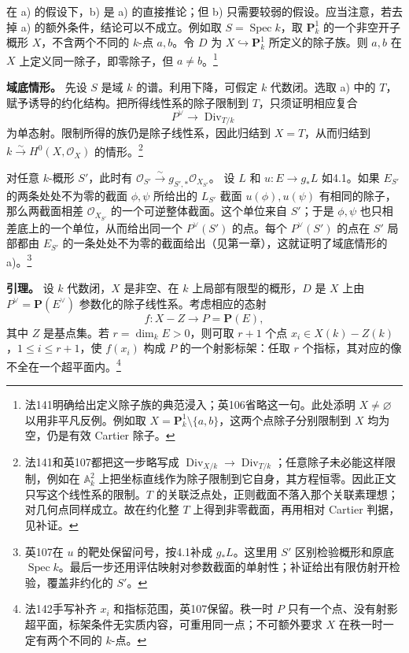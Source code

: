 \documentclass[openany,fontset=fandol]{ctexbook}
\DeclareMathOperator{\Spec}{Spec}
\DeclareMathOperator{\Div}{Div}
\newcommand{\OO}{\mathcal O}
\newcommand{\PP}{\mathbf P}
\begin{document}
在 a) 的假设下，b) 是 a) 的直接推论；但 b) 只需要较弱的假设。应当注意，若去掉 a) 的额外条件，结论可以不成立。例如取 \(S=\Spec k\)，取 \(\PP^1_k\) 的一个非空开子概形 \(X\)，不含两个不同的 \(k\)-点 \(a,b\)。令 \(D\) 为 \(X\hookrightarrow\PP^1_k\) 所定义的除子族。则 \(a,b\) 在 \(X\) 上定义同一除子，即零除子，但 \(a\ne b\)。\footnote{法141明确给出定义除子族的典范浸入；英106省略这一句。此处添明 \(X\ne\varnothing\) 以用非平凡反例。例如取 \(X=\PP^1_k\setminus\{a,b\}\)，这两个点除子分别限制到 \(X\) 均为空，仍是有效 Cartier 除子。}

\medskip\noindent\textbf{域底情形。}
先设 \(S\) 是域 \(k\) 的谱。利用下降，可假定 \(k\) 代数闭。选取 a) 中的 \(T\)，赋予诱导的约化结构。把所得线性系的除子限制到 \(T\)，只须证明相应复合
\[
 P^\vee\longrightarrow\Div_{T/k}
\]
为单态射。限制所得的族仍是除子线性系，因此归结到 \(X=T\)，从而归结到 \(k\xrightarrow{\sim} H^0(X,\OO_X)\) 的情形。\footnote{法141和英107都把这一步略写成 \(\Div_{X/k}\to\Div_{T/k}\)；任意除子未必能这样限制，例如在 \(\mathbb A^2_k\) 上把坐标直线作为除子限制到它自身，其方程恒零。因此正文只写这个线性系的限制。\(T\) 的关联泛点处，正则截面不落入那个关联素理想；对几何点同样成立。故在约化整 \(T\) 上得到非零截面，再用相对 Cartier 判据，见补证。}

对任意 \(k\)-概形 \(S'\)，此时有 \(\OO_{S'}\xrightarrow{\sim}g_{S',*}\OO_{X_{S'}}\)。
设 \(L\) 和 \(u:E\to g_*L\) 如4.1。如果 \(E_{S'}\) 的两条处处不为零的截面 \(\phi,\psi\) 所给出的 \(L_{S'}\) 截面 \(u(\phi),u(\psi)\) 有相同的除子，那么两截面相差 \(\OO_{X_{S'}}\) 的一个可逆整体截面。这个单位来自 \(S'\)；于是 \(\phi,\psi\) 也只相差底上的一个单位，从而给出同一个 \(P^\vee(S')\) 的点。每个 \(P^\vee(S')\) 的点在 \(S'\) 局部都由 \(E_{S'}\) 的一条处处不为零的截面给出（见第一章），这就证明了域底情形的 a)。\footnote{英107在 \(u\) 的靶处保留问号，按4.1补成 \(g_*L\)。这里用 \(S'\) 区别检验概形和原底 \(\Spec k\)。最后一步还用评估映射对参数截面的单射性；补证给出有限仿射开检验，覆盖非约化的 \(S'\)。}

\medskip\noindent\textbf{引理。}
设 \(k\) 代数闭，\(X\) 是非空、在 \(k\) 上局部有限型的概形，\(D\) 是 \(X\) 上由 \(P^\vee=\PP(E^\vee)\) 参数化的除子线性系。考虑相应的态射
\[
 f:X-Z\longrightarrow P=\PP(E),
\]
其中 \(Z\) 是基点集。若 \(r=\dim_k E>0\)，则可取 \(r+1\) 个点 \(x_i\in X(k)-Z(k)\)，\(1\leq i\leq r+1\)，使 \(f(x_i)\) 构成 \(P\) 的一个射影标架：任取 \(r\) 个指标，其对应的像不全在一个超平面内。\footnote{法142手写补齐 \(x_i\) 和指标范围，英107保留。秩一时 \(P\) 只有一个点、没有射影超平面，标架条件无实质内容，可重用同一点；不可额外要求 \(X\) 在秩一时一定有两个不同的 \(k\)-点。}
\end{document}
